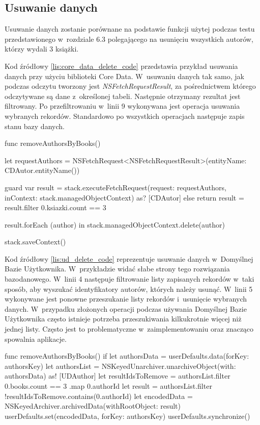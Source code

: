 \subsection{Usuwanie danych}

Usuwanie danych zostanie porównane na podstawie funkcji użytej podczas testu przedstawionego w~rozdziale 6.3 polegającego na usunięciu wszystkich autorów, którzy wydali 3 książki.

 Kod źródłowy \ref{lis:core_data_delete_code} przedstawia przykład usuwania danych przy użyciu biblioteki Core Data. W~usuwaniu danych tak samo, jak podczas odczytu tworzony jest \textit{NSFetchRequestResult}, za pośrednictwem którego odczytywane są dane z~określonej tabeli. Następnie otrzymany rezultat jest filtrowany. Po przefiltrowaniu w~linii 9 wykonywana jest operacja usuwania wybranych rekordów. Standardowo po wszystkich operacjach następuje zapis stanu bazy danych.
 
\begin{code}[
		language=swift,
		caption={Przykład usuwania danych Core Data},
		label={lis:core_data_delete_code},
	]
    func removeAuthorsByBooks() {
        let requestAuthors = NSFetchRequest<NSFetchRequestResult>(entityName: CDAutor.entityName())
        
        guard var result = stack.executeFetchRequest(request: requestAuthors, inContext: stack.managedObjectContext) as? [CDAutor] else { return }
        result = result.filter { 0.ksiazki.count == 3 }
        
        result.forEach { (author) in
            stack.managedObjectContext.delete(author)
        }
        
        stack.saveContext()
    }
 \end{code}
    \bigskip
    
Kod źródłowy \ref{lis:ud_delete_code} reprezentuje usuwanie danych w~Domyślnej Bazie Użytkownika. W~przykładzie widać słabe strony tego rozwiązania bazodanowego. W~linii 4 następuje filtrowanie listy zapisanych rekordów w~taki sposób, aby wyszukać identyfikatory autorów, których należy usunąć. W~linii 5 wykonywane jest ponowne przeszukanie listy rekordów i~usunięcie wybranych danych. W~przypadku złożonych operacji podczas używania Domyślnej Bazie Użytkownika często istnieje potrzeba przeszukiwania kilkukrotnie więcej niż jednej listy. Często jest to problematyczne w~zaimplementowaniu oraz znacząco spowalnia aplikacje.
    
\begin{code}[
		language=swift,
		caption={Przykład usuwania danych User Defaults},
		label={lis:ud_delete_code},
	]
        func removeAuthorsByBooks() {
        if  let authorsData = userDefaults.data(forKey: authorsKey) {
            let authorsList = NSKeyedUnarchiver.unarchiveObject(with: authorsData) as! [UDAuthor]
            let resultIdsToRemove = authorsList.filter { 0.books.count == 3 }.map { 0.authorId }
            let result = authorsList.filter { !resultIdsToRemove.contains(0.authorId) }
            let encodedData = NSKeyedArchiver.archivedData(withRootObject: result)
            userDefaults.set(encodedData, forKey: authorsKey)
            userDefaults.synchronize()
        }
    }
\end{code}
\bigskip

